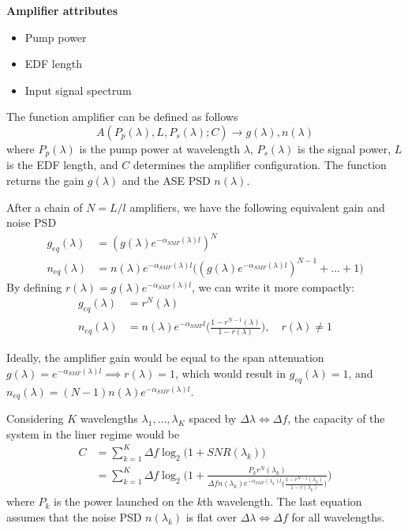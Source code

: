\documentclass[a4paper]{article}
\begin{document}
\noindent\textbf{Amplifier attributes}
\begin{itemize}
	\item Pump power
	\item EDF length
	\item Input signal spectrum
\end{itemize}

The function amplifier can be defined as follows
\begin{equation}
	A(P_p(\lambda), L, P_s(\lambda); C) \to g(\lambda), n(\lambda)
\end{equation}
where $P_p(\lambda)$ is the pump power at wavelength $\lambda$,  $P_s(\lambda)$ is the signal power, $L$ is the EDF length, and $C$ determines the amplifier configuration. The function returns the gain $g(\lambda)$ and the ASE PSD $n(\lambda)$.

After a chain of $N = L/l$ amplifiers, we have the following equivalent gain and noise PSD
\begin{align}
	g_{eq}(\lambda) &= (g(\lambda)e^{-\alpha_{SMF}(\lambda)l})^N \\
	n_{eq}(\lambda) &= n(\lambda)e^{-\alpha_{SMF}(\lambda)l}\Big((g(\lambda)e^{-\alpha_{SMF}(\lambda)l})^{N-1}+\ldots+1\Big)
\end{align}
By defining $r(\lambda) = g(\lambda)e^{-\alpha_{SMF}(\lambda)l}$, we can write it more compactly:
\begin{align}
g_{eq}(\lambda) &= r^N(\lambda) \\
n_{eq}(\lambda) &= n(\lambda)e^{-\alpha_{SMF}l}\Big(\frac{1-r^{N-1}(\lambda)}{1-r(\lambda)}\Big), \quad r(\lambda)\neq 1
\end{align}

Ideally, the amplifier gain would be equal to the span attenuation $g(\lambda) = e^{-\alpha_{SMF}(\lambda)l}\implies r(\lambda)=1$, which would result in $g_{eq}(\lambda) = 1$, and $n_{eq}(\lambda) = (N-1)n(\lambda)e^{-\alpha_{SMF}(\lambda)l}$.

Considering $K$ wavelengths $\lambda_1, \ldots, \lambda_{K}$ spaced by $\Delta\lambda\Longleftrightarrow\Delta f$, the capacity of the system in the liner regime would be
\begin{align}
	C &= \sum_{k = 1}^{K} \Delta f\log_2\Big(1 + SNR(\lambda_k)\Big)\\
	&= \sum_{k = 1}^{K} \Delta f\log_2\Bigg(1 + \frac{P_kr^N(\lambda_k)}{\Delta fn(\lambda_k)e^{-\alpha_{SMF}(\lambda_k)l}\Big(\frac{1-r^{N-1}(\lambda_k)}{1-r(\lambda_k)}\Big)}\Bigg) \label{eq:capacity}
\end{align}
where $P_k$ is the power launched on the $k$th wavelength. The last equation assumes that the noise PSD $n(\lambda_k)$ is flat over $\Delta\lambda\Longleftrightarrow\Delta f$ for all wavelengths.
\end{document}
